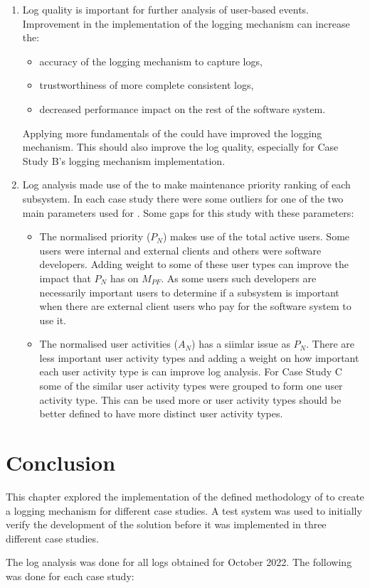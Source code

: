 \begin{enumerate}
	\item Log quality is important for further analysis of user-based events. Improvement in the implementation of the logging mechanism can increase the:
		\begin{itemize}
			\item accuracy of the logging mechanism to capture logs,
			\item trustworthiness of more complete consistent logs,
			\item decreased performance impact on the rest of the software system.
		\end{itemize}
	Applying more fundamentals of the  could have improved the logging mechanism. This should also improve the log quality, especially for Case Study B's logging mechanism implementation.
	\item Log analysis made use of the  to make maintenance priority ranking of each subsystem. In each case study there were some outliers for one of the two main parameters used for . Some gaps for this study with these parameters:
		\begin{itemize}
			\item The normalised priority ($P_N$) makes use of the total active users. Some users were internal and external clients and others were software developers. Adding weight to some of these user types can improve the impact that $P_N$ has on $M_{PF}$. As some users such developers are necessarily important users to determine if a subsystem is important when there are external client users who pay for the software system to use it.
			\item The normalised user activities ($A_N$) has a siimlar issue as $P_N$. There are less important user activity types and adding a weight on how important each user activity type is can improve log analysis. For Case Study C some of the similar user activity types were grouped to form one user activity type. This can be used more or user activity types should be better defined to have more distinct user activity types.
		\end{itemize}
\end{enumerate}

\section{Conclusion}
This chapter explored the implementation of the defined methodology of  to create a logging mechanism for different case studies. A test system was used to initially verify the development of the solution before it was implemented in three different case studies.\par The log analysis was done for all logs obtained for October 2022. The following was done for each case study:

